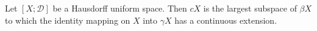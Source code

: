 Let $[X; \mathcal{D}]$ be a Hausdorff uniform space. Then $cX$ is the largest subspace of $\beta X$ to which the identity mapping on $X$ into $\gamma X$ has a continuous extension.
